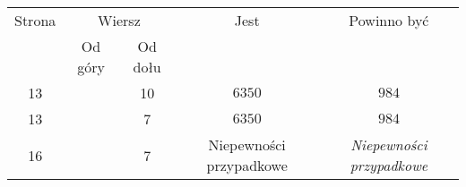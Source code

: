 \documentclass[a4paper,11pt]{article}
\begin{document}
\newpage



\begin{center}

  \begin{tabular}{|c|c|c|c|c|}
    \hline
    Strona & \multicolumn{2}{c|}{Wiersz} & Jest
                              & Powinno być \\ \cline{2-3}
    & Od góry & Od dołu & & \\
    \hline
    13 & & 10 & $6350$ & $984$ \\
    13 & & \hphantom{0}7 & $6350$ & $984$ \\
    16 & & \hphantom{0}7 & Niepewności przypadkowe
    & \textit{Niepewności przypadkowe} \\
    \hline
  \end{tabular}

\end{center}

\vspace{\VerSpaceSix}

















{}






\end{document}
